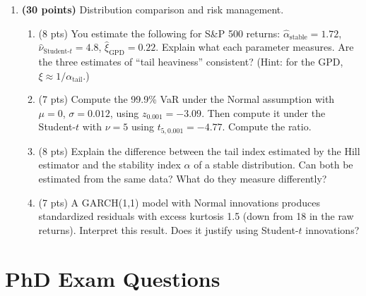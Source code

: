 \documentclass[11pt, a4paper]{article}
\theoremstyle{definition}
\begin{document}
\begin{enumerate}[label=\textbf{MSc-Q\arabic*.}]
\item \textbf{(30 points)} Distribution comparison and risk management.

\begin{enumerate}[label=(\alph*)]
  \item (8 pts) You estimate the following for S\&P 500 returns: $\hat{\alpha}_{\text{stable}} = 1.72$, $\hat{\nu}_{\text{Student-}t} = 4.8$, $\hat{\xi}_{\text{GPD}} = 0.22$. Explain what each parameter measures. Are the three estimates of ``tail heaviness'' consistent? (Hint: for the GPD, $\xi \approx 1/\alpha_{\text{tail}}$.)
  \item (7 pts) Compute the 99.9\% VaR under the Normal assumption with $\mu = 0$, $\sigma = 0.012$, using $z_{0.001} = -3.09$. Then compute it under the Student-$t$ with $\nu = 5$ using $t_{5, 0.001} = -4.77$. Compute the ratio.
  \item (8 pts) Explain the difference between the tail index estimated by the Hill estimator and the stability index $\alpha$ of a stable distribution. Can both be estimated from the same data? What do they measure differently?
  \item (7 pts) A GARCH(1,1) model with Normal innovations produces standardized residuals with excess kurtosis 1.5 (down from 18 in the raw returns). Interpret this result. Does it justify using Student-$t$ innovations?
\end{enumerate}

\end{enumerate}

\section{PhD Exam Questions}
\end{document}
